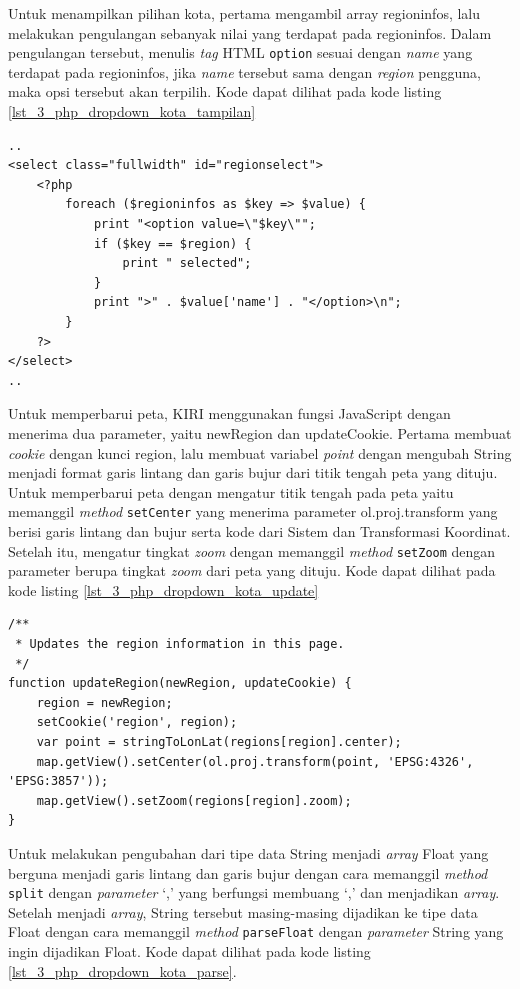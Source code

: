 Untuk menampilkan pilihan kota, pertama mengambil array regioninfos, lalu melakukan pengulangan sebanyak nilai yang terdapat pada regioninfos. Dalam pengulangan tersebut, menulis \textit{tag} HTML \verb!option! sesuai dengan \textit{name} yang terdapat pada regioninfos, jika \textit{name} tersebut sama dengan \textit{region} pengguna, maka opsi tersebut akan terpilih. Kode dapat dilihat pada kode listing \ref{lst_3_php_dropdown_kota_tampilan}

\begin{lstlisting}[caption=Menampilkan pilihan kota kepada pengguna ,label = {lst_3_php_dropdown_kota_tampilan}]
..
<select class="fullwidth" id="regionselect">
	<?php
		foreach ($regioninfos as $key => $value) {
			print "<option value=\"$key\"";
			if ($key == $region) {
				print " selected";
			}
			print ">" . $value['name'] . "</option>\n";
		}
	?>
</select>
..
\end{lstlisting}

Untuk memperbarui peta, KIRI menggunakan fungsi JavaScript dengan menerima dua parameter, yaitu newRegion dan updateCookie. Pertama membuat \textit{cookie} dengan kunci region, lalu membuat variabel \textit{point} dengan mengubah String menjadi format garis lintang dan garis bujur dari titik tengah peta yang dituju. Untuk memperbarui peta dengan mengatur titik tengah pada peta yaitu memanggil \textit{method} \verb!setCenter! yang menerima parameter ol.proj.transform yang berisi garis lintang dan bujur serta kode dari Sistem  dan Transformasi  Koordinat. Setelah itu, mengatur tingkat \textit{zoom} dengan memanggil \textit{method} \verb!setZoom! dengan parameter berupa tingkat \textit{zoom} dari peta yang dituju. Kode dapat dilihat pada kode listing \ref{lst_3_php_dropdown_kota_update}

\begin{lstlisting}[caption=Fungsi JavaScript untuk memperbarui peta ,label = {lst_3_php_dropdown_kota_update}]
/**
 * Updates the region information in this page.
 */
function updateRegion(newRegion, updateCookie) {
	region = newRegion;
	setCookie('region', region);
	var point = stringToLonLat(regions[region].center);
	map.getView().setCenter(ol.proj.transform(point, 'EPSG:4326', 'EPSG:3857'));
	map.getView().setZoom(regions[region].zoom);
}
\end{lstlisting}

Untuk melakukan pengubahan dari tipe data String menjadi \textit{array} Float yang berguna menjadi garis lintang dan garis bujur dengan cara memanggil \textit{method} \verb!split! dengan \textit{parameter} `,' yang berfungsi membuang `,' dan menjadikan \textit{array}. Setelah menjadi \textit{array}, String tersebut masing-masing dijadikan ke tipe data Float dengan cara memanggil \textit{method} \verb!parseFloat! dengan \textit{parameter} String yang ingin dijadikan Float. Kode dapat dilihat pada kode listing \ref{lst_3_php_dropdown_kota_parse}.

